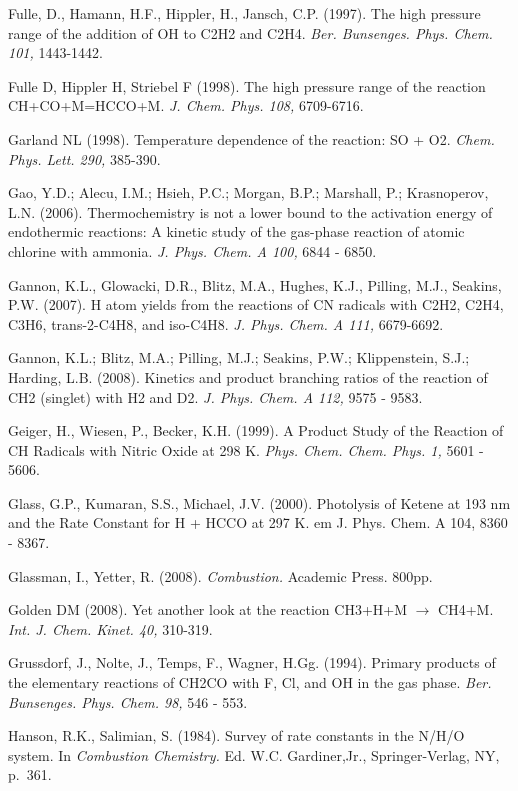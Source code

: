 \documentclass[12pt,landscape]{article}
\newcounter{reaction}
\begin{document}
Fulle, D., Hamann, H.F., Hippler, H., Jansch, C.P.  (1997).  The high pressure range of the addition of OH to C2H2 and C2H4. {\em Ber. Bunsenges. Phys. Chem. 101,} 1443-1442.

 Fulle D, Hippler H, Striebel F (1998). The high pressure range of the reaction CH+CO+M=HCCO+M. {\em J. Chem. Phys. 108,} 6709-6716.

Garland NL (1998). Temperature dependence of the reaction: SO + O2. {\em Chem. Phys. Lett. 290,} 385-390.

Gao, Y.D.; Alecu, I.M.; Hsieh, P.C.; Morgan, B.P.; Marshall, P.; Krasnoperov, L.N. (2006). Thermochemistry is not a lower bound to the activation energy of endothermic reactions: A kinetic study of the gas-phase reaction of atomic chlorine with ammonia.  {\em J. Phys. Chem. A 100,}  6844 - 6850.

Gannon, K.L., Glowacki, D.R., Blitz, M.A., Hughes, K.J., Pilling, M.J., Seakins, P.W. (2007). H atom yields from the reactions of CN radicals with C2H2, C2H4, C3H6, trans-2-C4H8, and iso-C4H8. {\em J. Phys. Chem. A 111,}  6679-6692.

Gannon, K.L.; Blitz, M.A.; Pilling, M.J.; Seakins, P.W.; Klippenstein, S.J.; Harding, L.B. (2008). Kinetics and product branching ratios of the reaction of CH2 (singlet) with H2 and D2.  {\em J. Phys. Chem. A 112,} 9575 - 9583.

Geiger, H., Wiesen, P., Becker, K.H. (1999).  A Product Study of the Reaction of CH Radicals with Nitric Oxide at 298 K.  {\em Phys. Chem. Chem. Phys. 1,} 5601 - 5606.

Glass, G.P., Kumaran, S.S., Michael, J.V. (2000).  Photolysis of Ketene at 193 nm and the Rate Constant for H + HCCO at 297 K.  {em J. Phys. Chem. A 104,} 8360 - 8367.

Glassman, I., Yetter, R.  (2008).  {\em Combustion.}  Academic Press. 800pp.

Golden DM (2008). Yet another look at the reaction CH3+H+M $\rightarrow$ CH4+M. {\em Int. J. Chem. Kinet. 40,} 310-319.

Grussdorf, J., Nolte, J., Temps, F., Wagner, H.Gg. (1994).  Primary products of the elementary reactions of CH2CO with F, Cl, and OH in the gas phase.  {\em Ber. Bunsenges. Phys. Chem.  98,} 546 - 553.

Hanson, R.K., Salimian, S. (1984). Survey of rate constants in the N/H/O system. In {\em Combustion Chemistry.} Ed. W.C. Gardiner,Jr., Springer-Verlag, NY, p.\ 361.
\end{document}
